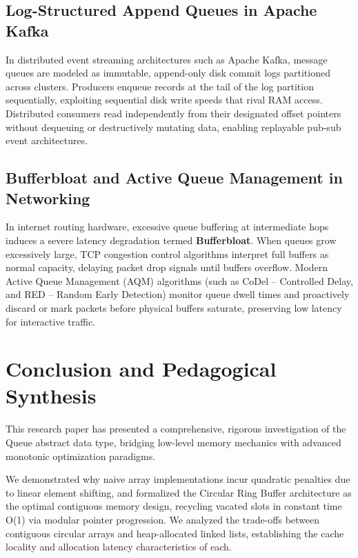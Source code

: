 \documentclass[10pt,journal,compsoc,onecolumn]{IEEEtran}
\begin{document}
\subsection{Log-Structured Append Queues in Apache Kafka}
In distributed event streaming architectures such as Apache Kafka, message queues are modeled as immutable, append-only disk commit logs partitioned across clusters. Producers enqueue records at the tail of the log partition sequentially, exploiting sequential disk write speeds that rival RAM access. Distributed consumers read independently from their designated offset pointers without dequeuing or destructively mutating data, enabling replayable pub-sub event architectures.

\subsection{Bufferbloat and Active Queue Management in Networking}
In internet routing hardware, excessive queue buffering at intermediate hops induces a severe latency degradation termed \textbf{Bufferbloat}. When queues grow excessively large, TCP congestion control algorithms interpret full buffers as normal capacity, delaying packet drop signals until buffers overflow. Modern Active Queue Management (AQM) algorithms (such as CoDel -- Controlled Delay, and RED -- Random Early Detection) monitor queue dwell times and proactively discard or mark packets before physical buffers saturate, preserving low latency for interactive traffic.

\section{Conclusion and Pedagogical Synthesis}
\label{sec:conclusion}

This research paper has presented a comprehensive, rigorous investigation of the Queue abstract data type, bridging low-level memory mechanics with advanced monotonic optimization paradigms. 

We demonstrated why naive array implementations incur quadratic penalties due to linear element shifting, and formalized the Circular Ring Buffer architecture as the optimal contiguous memory design, recycling vacated slots in constant time O(1) via modular pointer progression. We analyzed the trade-offs between contiguous circular arrays and heap-allocated linked lists, establishing the cache locality and allocation latency characteristics of each.
\end{document}
